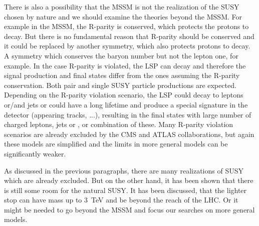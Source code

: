 There is also a possibility that the MSSM is not the realization of the SUSY chosen by nature and we should examine the theories beyond the MSSM. For example in the MSSM, the R-parity is conserved, which protects the protons to decay. But there is no fundamental reason that R-parity should be conserved and it could be replaced by another symmetry, which also protects protons to decay. A symmetry which conserves the baryon number but not the lepton one, for example. In the case R-parity is violated, the LSP can decay and therefore the signal production and final states differ from the ones assuming the R-parity conservation. Both pair and single SUSY particle productions are expected. Depending on the R-parity violation scenario, the LSP could decay to leptons or/and jets or could have a long lifetime and produce a special signature in the detector (appearing tracks, ...), resulting in the final states with large number of charged leptons, jets or \MET, or combination of these. Many R-parity violation scenarios are already excluded by the CMS and ATLAS collaborations, but again these models are simplified and the limits in more general models can be significantly weaker.

As discussed in the previous paragraphs, there are many realizations of SUSY which are already excluded. But on the other hand, it has been shown that there is still some room for the natural SUSY. It has been discussed, that the lighter stop can have mass up to 3~TeV and be beyond the reach of the LHC. Or it might be needed to go beyond the MSSM and focus our searches on more general models.

